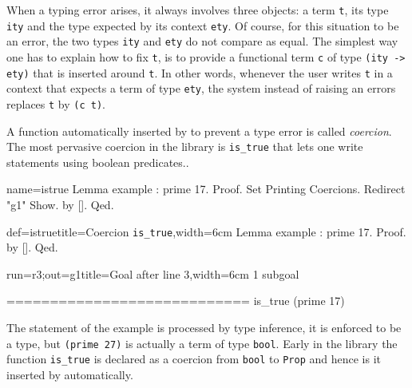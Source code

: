 \mcbREQUIRE{}
\mcbPROVIDE{}


When a typing error arises, it always involves three objects:
a term \lstinline/t/, its type \lstinline/ity/ and the type
expected by its context \lstinline/ety/.  Of course, for this
situation to be an error, the two types \lstinline/ity/ and
\lstinline/ety/ do not compare as equal.
The simplest way one has to explain \Coq{} how to fix \lstinline/t/,
is to provide a functional term \lstinline/c/ of type
\lstinline/(ity -> ety)/ that is inserted around \lstinline/t/.
In other words, whenever the user writes \lstinline/t/ in a context
that expects a term of type \lstinline/ety/, the system instead of
raising an errors replaces \lstinline/t/ by \lstinline/(c t)/.

A function automatically inserted by \Coq{} to prevent a type
error is called \emph{coercion}.
The most pervasive coercion in the \mcbMC{} library is
\lstinline/is_true/ that lets one write statements using boolean
predicates..

\begin{coqdef}{name=istrue}
Lemma example : prime 17.
Proof.
Set Printing Coercions. Redirect "g1" Show.
by [].
Qed.
\end{coqdef}
\begin{coq}{def=istrue}{title=Coercion \lstinline/is_true/,width=6cm}
Lemma example : prime 17.
Proof.  by [].  Qed.
\end{coq}
\begin{coqout}{run=r3;out=g1}{title=Goal after line 3,width=6cm}
1 subgoal

============================
is_true (prime 17)
\end{coqout}

The statement of the example is processed by type inference,
it is enforced to be a type, but \lstinline/(prime 27)/ is actually
a term of type \lstinline/bool/.  Early in the library the
function \lstinline/is_true/ is declared as a coercion from
\lstinline/bool/ to \lstinline/Prop/ and hence is it inserted
by \Coq{} automatically.

